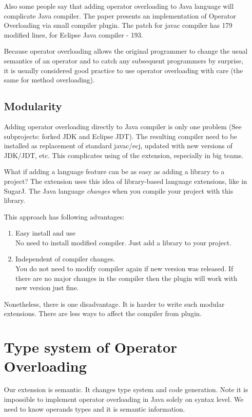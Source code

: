 \documentclass{aircc}
\begin{document}
Also some people say that adding operator overloading to Java language will
complicate Java compiler.
The paper presents an implementation of Operator Overloading via small compiler plugin.
The patch for javac compiler has 179 modified lines, for Eclipse Java compiler - 193.

Because operator overloading allows the original programmer to change the usual semantics of an operator and to catch any subsequent programmers by surprise, it is usually considered good practice to use operator overloading with care (the same for method overloading).

\subsection{Modularity}
Adding operator overloading directly to Java compiler is only one problem
(See subprojects: forked JDK\cite{javac-oo} and Eclipse JDT\cite{eclipse.jdt-oo}).
The resulting compiler need to be installed as replacement of standard javac/ecj, updated with new versions of JDK/JDT, etc.
This complicates using of the extension, especially in big teams.

What if adding a language feature can be as easy as adding a library to a project?
The extension uses this idea of library-based language extensions, like in SugarJ\cite{sugarj}.
The Java language \textit{changes} when you compile your project with this library.

This approach has following advantages:
\begin{enumerate}
 \item Easy install and use \\
 No need to install modified compiler. Just add a library to your project.
 \item Independent of compiler changes. \\
 You do not need to modify compiler again if new version was released.
 If there are no major changes in the compiler then the plugin will work with new version just fine.
\end{enumerate}
Nonetheless, there is one disadvantage. It is harder to write such modular extensions. 
There are less ways to affect the compiler from plugin.

\section{Type system of Operator Overloading \label{typesystem}}

Our extension is semantic. It changes type system and code generation. 
Note it is impossible to implement operator overloading in Java solely on syntax level. 
We need to know operands types and it is semantic information.
\end{document}
